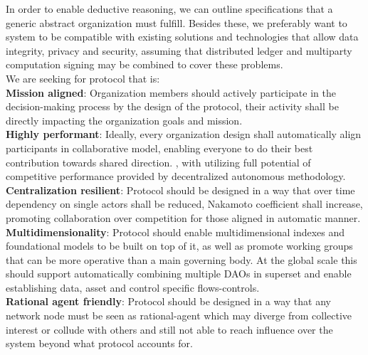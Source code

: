 \documentclass{article}
\begin{document}
\begin{CJK}{UTF8}{gbsn}
\begin{multicols}{2}
        In order to enable deductive reasoning, we can outline specifications that a generic abstract organization must fulfill. Besides these, we preferably want to system to be compatible with existing solutions and technologies that allow data integrity, privacy and security, assuming that distributed ledger and multiparty computation signing may be combined to cover these problems. \\
        We are seeking for protocol that is:\\
        \textbf{Mission aligned}: Organization members should actively participate in the decision-making process by the design of the protocol, their activity shall be directly impacting the organization goals and mission.\\
        \textbf{Highly performant}: Ideally, every organization design shall automatically align participants in collaborative model, enabling everyone to do their best contribution towards shared direction. , with utilizing full potential of competitive performance provided by decentralized autonomous methodology.\\
        \textbf{Centralization resilient}: Protocol should be designed in a way that over time dependency on single actors shall be reduced, Nakamoto coefficient shall increase, promoting collaboration over competition for those aligned in automatic manner. \\
        \textbf{Multidimensionality}: Protocol should enable multidimensional indexes and foundational models to be built on top of it, as well as promote working groups that can be more operative than a main governing body. At the global scale this should support automatically combining multiple DAOs in superset and enable establishing data, asset and control specific flows-controls.\\
        \textbf{Rational agent friendly}: Protocol should be designed in a way that any network node must be seen as rational-agent which may diverge from collective interest or collude with others and still not able to reach  influence over the system beyond what protocol accounts for.



\end{multicols}
\end{CJK}
\end{document}
